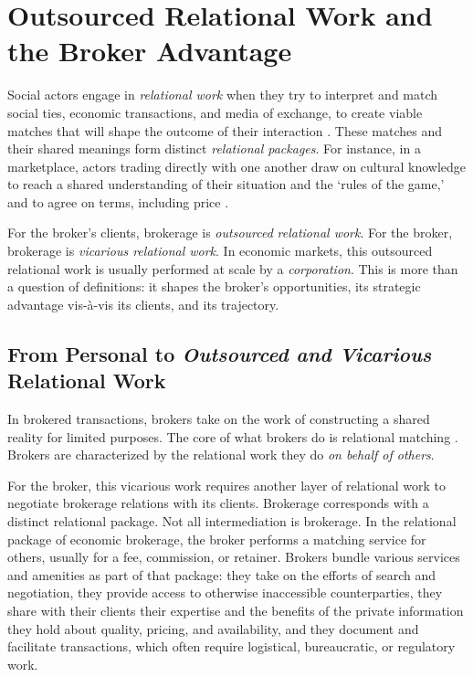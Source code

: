 \documentclass[
]{article}
\begin{document}
\section{Outsourced Relational Work and the Broker Advantage}

Social actors engage in \emph{relational work} when they try to interpret and match social ties, economic transactions, and media of exchange, to create viable matches that will shape the outcome of their interaction \autocites[151]{zelizerHowBecameRelational2012}{zelizerPurchaseIntimacy2005}[see also][255]{bandeljRelationalWorkEconomy2020}. These matches and their shared meanings form distinct \emph{relational packages}. For instance, in a marketplace, actors trading directly with one another draw on cultural knowledge to reach a shared understanding of their situation and the `rules of the game,' and to agree on terms, including price \autocite[137]{blockRelationalWorkMarket2012}.

For the broker's clients, brokerage is \emph{outsourced} \emph{relational work}. For the broker, brokerage is \emph{vicarious relational work}. In economic markets, this outsourced relational work is usually performed at scale by a \emph{corporation}. This is more than a question of definitions: it shapes the broker's opportunities, its strategic advantage vis-à-vis its clients, and its trajectory.

\subsection{\texorpdfstring{From Personal to \emph{Outsourced and Vicarious} Relational Work}{From Personal to Outsourced and Vicarious Relational Work}}

In brokered transactions, brokers take on the work of constructing a shared reality for limited purposes. The core of what brokers do is relational matching \autocite[see][]{zelizerHowBecameRelational2012}. Brokers are characterized by the relational work they do \emph{on behalf of others}.

For the broker, this vicarious work requires another layer of relational work to negotiate brokerage relations with its clients. Brokerage corresponds with a distinct relational package. Not all intermediation is brokerage. In the relational package of economic brokerage, the broker performs a matching service for others, usually for a fee, commission, or retainer. Brokers bundle various services and amenities as part of that package: they take on the efforts of search and negotiation, they provide access to otherwise inaccessible counterparties, they share with their clients their expertise and the benefits of the private information they hold about quality, pricing, and availability, and they document and facilitate transactions, which often require logistical, bureaucratic, or regulatory work.
\end{document}
